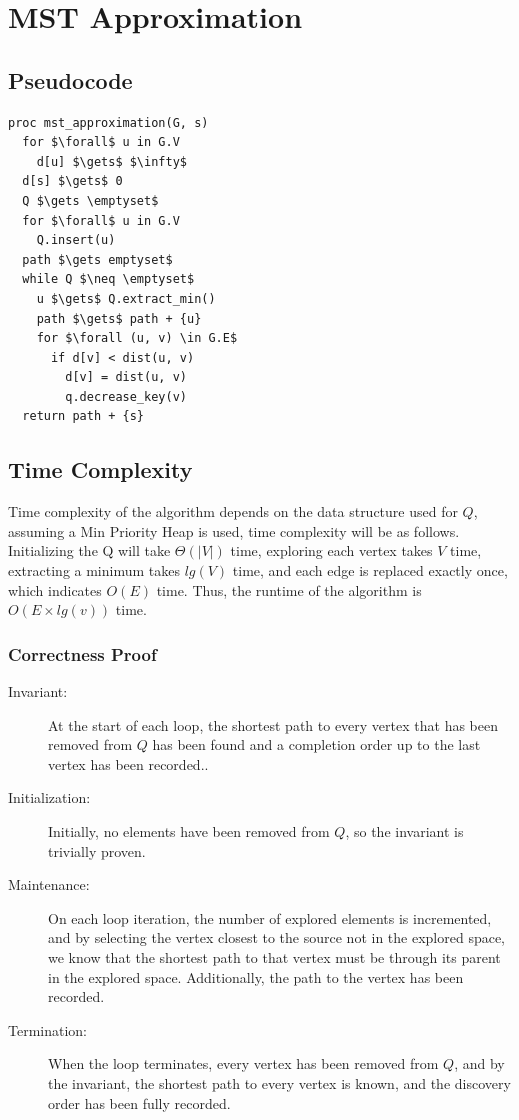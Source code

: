\documentclass[a4paper,12pt]{article}
\begin{document}
\section{MST Approximation}
\subsection{Pseudocode}
\begin{lstlisting}[mathescape=true]
proc mst_approximation(G, s)
  for $\forall$ u in G.V
    d[u] $\gets$ $\infty$
  d[s] $\gets$ 0
  Q $\gets \emptyset$
  for $\forall$ u in G.V
    Q.insert(u)
  path $\gets emptyset$
  while Q $\neq \emptyset$
    u $\gets$ Q.extract_min()
    path $\gets$ path + {u}
    for $\forall (u, v) \in G.E$
      if d[v] < dist(u, v)
        d[v] = dist(u, v)
        q.decrease_key(v)
  return path + {s}
\end{lstlisting}
\subsection{Time Complexity}
Time complexity of the algorithm depends on the data structure used for $Q$, assuming a Min Priority Heap is used, time complexity will be as follows. Initializing the Q will take $\Theta(|V|)$ time, exploring each vertex takes $V$ time, extracting a minimum takes $lg(V)$ time, and each edge is replaced exactly once, which indicates $O(E)$ time. Thus, the runtime of the algorithm is $O(E \times lg(v))$ time.
\subsubsection{Correctness Proof}
\begin{description}
\item [Invariant: ] At the start of each loop, the shortest path to every vertex that has been removed from $Q$ has been found and a completion order up to the last vertex has been recorded..
\item [Initialization: ] Initially, no elements have been removed from $Q$, so the invariant is trivially proven.
\item [Maintenance: ] On each loop iteration, the number of explored elements is incremented, and by selecting the vertex closest to the source not in the explored space, we know that the shortest path to that vertex must be through its parent in the explored space. Additionally, the path to the vertex has been recorded.
\item [Termination: ] When the loop terminates, every vertex has been removed from $Q$, and by the invariant, the shortest path to every vertex is known, and the discovery order has been fully recorded.
\end{description}
\end{document}
